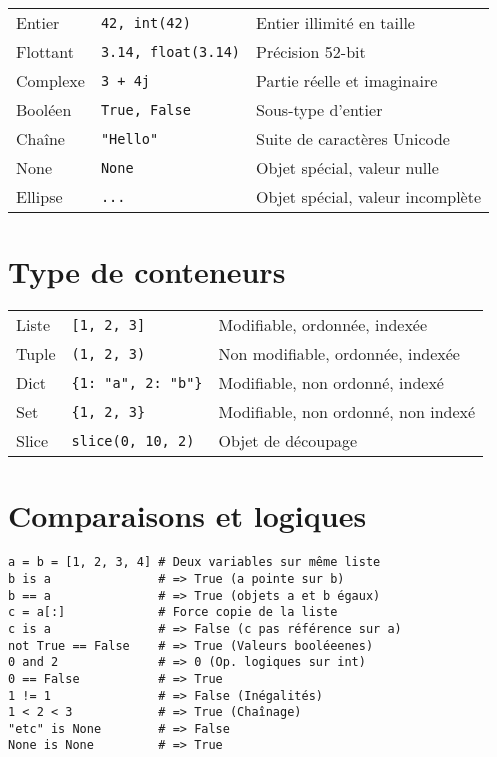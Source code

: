 \documentclass{article}
\begin{document}
\begin{multicols*}{4}
\begin{tabularx}{\columnwidth}{llX}
    Entier & \texttt{42, int(42)} & Entier illimité en taille \\
    Flottant & \texttt{3.14, float(3.14)} & Précision 52-bit \\
    Complexe & \texttt{3 + 4j} & Partie réelle et imaginaire \\
    Booléen & \texttt{True, False} & Sous-type d'entier \\
    Chaîne & \texttt{"Hello"} & Suite de caractères Unicode \\
    None & \texttt{None} & Objet spécial, valeur nulle \\
    Ellipse & \texttt{...} & Objet spécial, valeur incomplète \\
\end{tabularx}

\section*{Type de conteneurs}

\begin{tabularx}{\columnwidth}{llX}
Liste & \texttt{[1, 2, 3]} & Modifiable, ordonnée, indexée \\
Tuple & \texttt{(1, 2, 3)} & Non modifiable, ordonnée, indexée \\
Dict & \texttt{\{1: "a", 2: "b"\}} & Modifiable, non ordonné, indexé \\
Set & \texttt{\{1, 2, 3\}} & Modifiable, non ordonné, non indexé \\
Slice & \texttt{slice(0, 10, 2)} & Objet de découpage \\
\end{tabularx}

\section*{Comparaisons et logiques}

\begin{lstlisting}
a = b = [1, 2, 3, 4] # Deux variables sur même liste
b is a               # => True (a pointe sur b)
b == a               # => True (objets a et b égaux)
c = a[:]             # Force copie de la liste
c is a               # => False (c pas référence sur a)
not True == False    # => True (Valeurs booléeenes)
0 and 2              # => 0 (Op. logiques sur int)
0 == False           # => True
1 != 1               # => False (Inégalités)
1 < 2 < 3            # => True (Chaînage)
"etc" is None        # => False
None is None         # => True
\end{lstlisting}


\end{multicols*}
\end{document}
